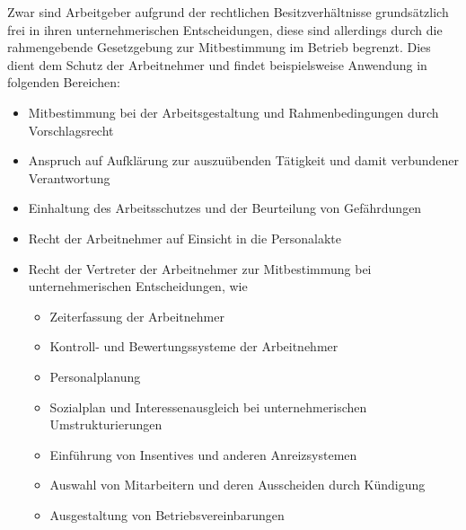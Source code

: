 {
Zwar sind Arbeitgeber aufgrund der rechtlichen Besitzverhältnisse grundsätzlich frei in ihren unternehmerischen Entscheidungen, diese sind allerdings durch die rahmengebende Gesetzgebung zur Mitbestimmung im Betrieb begrenzt. Dies dient dem Schutz der Arbeitnehmer und findet beispielsweise Anwendung in folgenden Bereichen: 
}
\newline
\begin{itemize}
	\item Mitbestimmung bei der Arbeitsgestaltung und Rahmenbedingungen durch Vorschlagsrecht
	\item Anspruch auf Aufklärung zur auszuübenden Tätigkeit und damit verbundener Verantwortung
	\item Einhaltung des Arbeitsschutzes und der Beurteilung von Gefährdungen
	\item Recht der Arbeitnehmer auf Einsicht in die Personalakte
	\item Recht der Vertreter der Arbeitnehmer zur Mitbestimmung bei unternehmerischen Entscheidungen, wie
	\begin{itemize}
		\item Zeiterfassung der Arbeitnehmer
		\item Kontroll- und Bewertungssysteme der Arbeitnehmer
		\item Personalplanung
		\item Sozialplan und Interessenausgleich bei unternehmerischen Umstrukturierungen
		\item Einführung von Insentives und anderen Anreizsystemen
		\item Auswahl von Mitarbeitern und deren Ausscheiden durch Kündigung
		\item Ausgestaltung von Betriebsvereinbarungen
	\end{itemize}
\end{itemize}